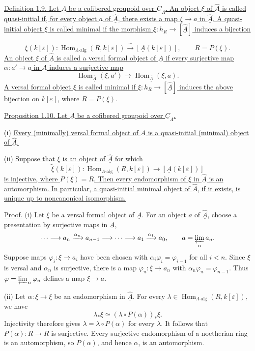 \underline{Definition 1.9. Let $\underline A$ be a cofibered groupoid
over $\underline C_\Lambda$. An object $\xi$ of
$\widehat{\underline A}$ is called quasi-initial if, for every object
$a$ of $\widehat{\underline A}$, there exists a map $\xi\to a$ in
$\widehat{\underline A}$. A quasi-initial object $\xi$ is called
minimal if the morphism
$\xi:h_R\longrightarrow[\widehat{\underline A}]$ induces a bijection}


\[
 \xi(k[\varepsilon]):
 \operatorname{Hom}_{\Lambda\text{-alg}}(R,k[\varepsilon])
 \xrightarrow{\ \sim\ }
 [\underline A(k[\varepsilon])],
 \qquad R=P(\xi).
\]
\underline{An object $\xi$ of $\widehat{\underline A}$ is called a
versal formal object of $\underline A$ if every surjective map
$\alpha:a'\to a$ in $\underline A$ induces a surjective map}
\[
 \operatorname{Hom}_{\widehat{\underline A}}(\xi,a')
 \longrightarrow
 \operatorname{Hom}_{\widehat{\underline A}}(\xi,a).
\]
\underline{A versal formal object $\xi$ is called minimal if
$\xi:h_R\longrightarrow[\widehat{\underline A}]$ induces the above
bijection on $k[\varepsilon]$, where $R=P(\xi)$.}

\underline{Proposition 1.10. Let $\underline A$ be a cofibered
groupoid over $\underline C_\Lambda$.}

(i) \underline{Every (minimally) versal formal object of
$\underline A$ is a quasi-initial (minimal) object of
$\widehat{\underline A}$.}

(ii) \underline{Suppose that $\xi$ is an object of
$\widehat{\underline A}$ for which}
\[
 \widetilde\xi(k[\varepsilon]):
 \operatorname{Hom}_{\Lambda\text{-alg}}(R,k[\varepsilon])
 \longrightarrow[\underline A(k[\varepsilon])]
\]
\underline{is injective, where $P(\xi)=R$. Then every endomorphism of
$\xi$ in $\widehat{\underline A}$ is an automorphism. In particular,
a quasi-initial minimal object of $\widehat{\underline A}$, if it
exists, is unique up to noncanonical isomorphism.}

\underline{Proof.} (i) Let $\xi$ be a versal formal object of
$\underline A$. For an object $a$ of $\widehat{\underline A}$, choose
a presentation by surjective maps in $\underline A$,
\[
 \cdots\longrightarrow a_n\xrightarrow{\alpha_n}a_{n-1}
 \longrightarrow\cdots\longrightarrow
 a_1\xrightarrow{\alpha_1}a_0,
 \qquad a=\varprojlim_n a_n.
\]
Suppose maps $\varphi_i:\xi\longrightarrow a_i$ have been chosen with
$\alpha_i\varphi_i=\varphi_{i-1}$ for all $i<n$. Since $\xi$ is
versal and $\alpha_n$ is surjective, there is a map
$\varphi_n:\xi\longrightarrow a_n$ with
$\alpha_n\varphi_n=\varphi_{n-1}$. Thus
$\varphi=\varprojlim_n\varphi_n$ defines a map $\xi\longrightarrow a$.

(ii) Let $\alpha:\xi\longrightarrow\xi$ be an endomorphism in
$\widehat{\underline A}$. For every
$\lambda\in\operatorname{Hom}_{\Lambda\text{-alg}}
(R,k[\varepsilon])$, we have
\[
 \lambda_*\xi\simeq
 (\lambda\circ P(\alpha))_*\xi.
\]
Injectivity therefore gives
$\lambda=\lambda\circ P(\alpha)$ for every $\lambda$. It follows that
$P(\alpha):R\longrightarrow R$ is surjective. Every surjective
endomorphism of a noetherian ring is an automorphism, so $P(\alpha)$,
and hence $\alpha$, is an automorphism.

